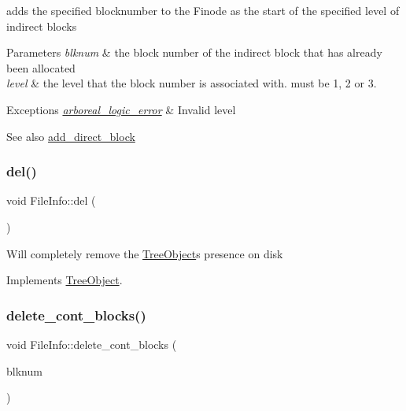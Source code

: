 adds the specified blocknumber to the Finode as the start of the specified level of indirect blocks 
\begin{DoxyParams}{Parameters}
{\em blknum} & the block number of the indirect block that has already been allocated \\
\hline
{\em level} & the level that the block number is associated with. must be 1, 2 or 3. \\
\hline
\end{DoxyParams}

\begin{DoxyExceptions}{Exceptions}
{\em \mbox{\hyperlink{classarboreal__logic__error}{arboreal\+\_\+logic\+\_\+error}}} & Invalid level \\
\hline
\end{DoxyExceptions}
\begin{DoxySeeAlso}{See also}
\mbox{\hyperlink{class_file_info_a1537d2ac2b5c170d144911c8337c81bc}{add\+\_\+direct\+\_\+block}} 
\end{DoxySeeAlso}
\mbox{\label{class_file_info_a2ca34d945ed1208f227a249ba72ee427}} 
\subsubsection{\texorpdfstring{del()}{del()}}
{\footnotesize\ttfamily void File\+Info\+::del (\begin{DoxyParamCaption}{ }\end{DoxyParamCaption})\hspace{0.3cm}{\ttfamily [virtual]}}

Will completely remove the \mbox{\hyperlink{class_tree_object}{Tree\+Object}}\textquotesingle{}s presence on disk 

Implements \mbox{\hyperlink{class_tree_object_af390b7479aa972888e594c07a85740b6}{Tree\+Object}}.

\mbox{\label{class_file_info_a8c6b58cb9f7e9978064291ef81380e01}} 
\subsubsection{\texorpdfstring{delete\+\_\+cont\+\_\+blocks()}{delete\_cont\_blocks()}}
{\footnotesize\ttfamily void File\+Info\+::delete\+\_\+cont\+\_\+blocks (\begin{DoxyParamCaption}\item[{Blk\+Num\+Type}]{blknum }\end{DoxyParamCaption})\hspace{0.3cm}{\ttfamily [virtual]}}

